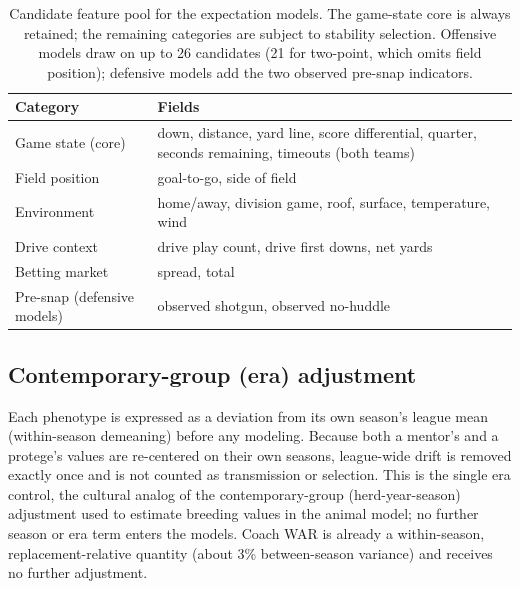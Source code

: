 \documentclass[11pt]{article}
\begin{document}
\begin{table}[t]
\centering
\caption{Candidate feature pool for the expectation models. The game-state core is
always retained; the remaining categories are subject to stability selection.
Offensive models draw on up to 26 candidates (21 for two-point, which omits field
position); defensive models add the two observed pre-snap indicators.}
\label{tab:features}
\begin{tabular}{@{}l p{}@{}}
\toprule
Category & Fields \\
\midrule
Game state (core) & down, distance, yard line, score differential, quarter, seconds remaining, timeouts (both teams) \\
Field position & goal-to-go, side of field \\
Environment & home/away, division game, roof, surface, temperature, wind \\
Drive context & drive play count, drive first downs, net yards \\
Betting market & spread, total \\
Pre-snap (defensive models) & observed shotgun, observed no-huddle \\
\bottomrule
\end{tabular}
\end{table}

\subsection{Contemporary-group (era) adjustment}
Each phenotype is expressed as a deviation from its own season's league mean
(within-season demeaning) before any modeling. Because both a mentor's and a
protege's values are re-centered on their own seasons, league-wide drift is removed
exactly once and is not counted as transmission or selection. This is the single
era control, the cultural analog of the contemporary-group (herd-year-season)
adjustment used to estimate breeding values in the animal model; no further season
or era term enters the models. Coach WAR is already a within-season,
replacement-relative quantity (about 3\% between-season variance) and receives no
further adjustment.
\end{document}
